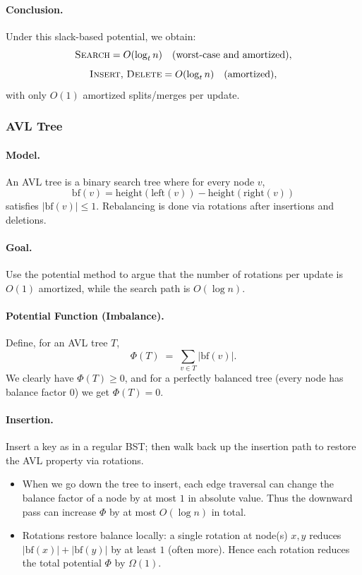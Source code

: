 \documentclass[9pt]{extarticle}
\begin{document}
\paragraph{Conclusion.}
Under this slack-based potential, we obtain:
\[
  \textsc{Search} = O(\log_t n) \quad (\text{worst-case and amortized}),
\]
\[
  \textsc{Insert},\, \textsc{Delete} = O(\log_t n) \quad (\text{amortized}),
\]
with only $O(1)$ amortized splits/merges per update.

\subsubsection{AVL Tree}

\paragraph{Model.}
An AVL tree is a binary search tree where for every node $v$,
\[
  \text{bf}(v) = \text{height}(\text{left}(v)) - \text{height}(\text{right}(v))
\]
satisfies $|\text{bf}(v)| \le 1$.
Rebalancing is done via rotations after insertions and deletions.

\paragraph{Goal.}
Use the potential method to argue that the number of rotations per update
is $O(1)$ amortized, while the search path is $O(\log n)$.

\paragraph{Potential Function (Imbalance).}
Define, for an AVL tree $T$,
\[
  \Phi(T) \;=\; \sum_{v \in T} |\text{bf}(v)|.
\]
We clearly have $\Phi(T) \ge 0$, and for a perfectly balanced tree (every node
has balance factor $0$) we get $\Phi(T) = 0$.

\paragraph{Insertion.}
Insert a key as in a regular BST; then walk back up the insertion path
to restore the AVL property via rotations.

\begin{itemize}
  \item When we go down the tree to insert, each edge traversal can change the
        balance factor of a node by at most $1$ in absolute value.
        Thus the downward pass can increase $\Phi$ by at most $O(\log n)$ in total.
  \item Rotations restore balance locally: a single rotation at node(s)
        $x,y$ reduces $|\text{bf}(x)| + |\text{bf}(y)|$ by at least $1$
        (often more). Hence each rotation reduces the total potential
        $\Phi$ by $\Omega(1)$.
\end{itemize}
\end{document}
